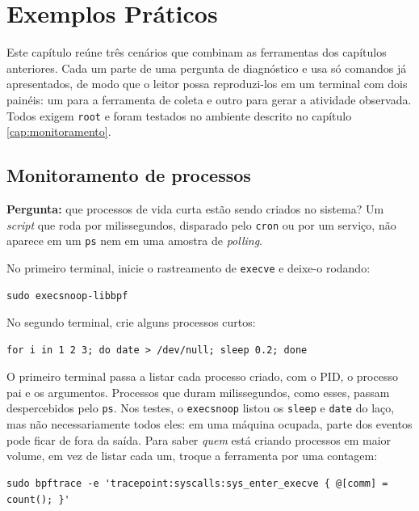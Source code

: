 \chapter{Exemplos Práticos}\label{cap:exemplos}

Este capítulo reúne três cenários que combinam as ferramentas dos capítulos anteriores. Cada um parte de uma pergunta de diagnóstico e usa só comandos já apresentados, de modo que o leitor possa reproduzi-los em um terminal com dois painéis: um para a ferramenta de coleta e outro para gerar a atividade observada. Todos exigem \texttt{root} e foram testados no ambiente descrito no capítulo \ref{cap:monitoramento}.

\section{Monitoramento de processos}

\textbf{Pergunta:} que processos de vida curta estão sendo criados no sistema? Um \textit{script} que roda por milissegundos, disparado pelo \texttt{cron} ou por um serviço, não aparece em um \texttt{ps} nem em uma amostra de \textit{polling}.

No primeiro terminal, inicie o rastreamento de \texttt{execve} e deixe-o rodando:

\begin{lstlisting}
sudo execsnoop-libbpf
\end{lstlisting}

No segundo terminal, crie alguns processos curtos:

\begin{lstlisting}
for i in 1 2 3; do date > /dev/null; sleep 0.2; done
\end{lstlisting}

O primeiro terminal passa a listar cada processo criado, com o PID, o processo pai e os argumentos. Processos que duram milissegundos, como esses, passam despercebidos pelo \texttt{ps}. Nos testes, o \texttt{execsnoop} listou os \texttt{sleep} e \texttt{date} do laço, mas não necessariamente todos eles: em uma máquina ocupada, parte dos eventos pode ficar de fora da saída. Para saber \textit{quem} está criando processos em maior volume, em vez de listar cada um, troque a ferramenta por uma contagem:

\begin{lstlisting}
sudo bpftrace -e 'tracepoint:syscalls:sys_enter_execve { @[comm] = count(); }'
\end{lstlisting}

